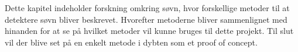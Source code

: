 Dette kapitel indeholder forskning omkring søvn, hvor forskellige metoder til at detektere søvn bliver beskrevet.
Hvorefter metoderne bliver sammenlignet med hinanden for at se på hvilket metoder vil kunne bruges til dette projekt.
Til slut vil der blive set på en enkelt metode i dybten som et proof of concept.